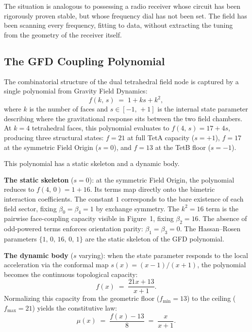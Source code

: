 \documentclass[twocolumn]{iopjournal}
\begin{document}
The situation is analogous to possessing a radio receiver whose circuit has been rigorously proven stable, but whose frequency dial has not been set. The field has been scanning every frequency, fitting to data, without extracting the tuning from the geometry of the receiver itself.

\subsection*{The GFD Coupling Polynomial}

The combinatorial structure of the dual tetrahedral field node is captured by a single polynomial from Gravity Field Dynamics:
\begin{equation}
f(k,\, s) \;=\; 1 + ks + k^2,
\end{equation}
where $k$ is the number of faces and $s \in [-1,\, +1]$ is the internal state parameter describing where the gravitational response sits between the two field chambers. At $k = 4$ tetrahedral faces, this polynomial evaluates to $f(4,\, s) = 17 + 4s$, producing three structural states: $f = 21$ at full TetA capacity ($s = +1$), $f = 17$ at the symmetric Field Origin ($s = 0$), and $f = 13$ at the TetB floor ($s = -1$).

This polynomial has a static skeleton and a dynamic body.

\textbf{The static skeleton} ($s = 0$): at the symmetric Field Origin, the polynomial reduces to $f(4,\, 0) = 1 + 16$. Its terms map directly onto the bimetric interaction coefficients. The constant $1$ corresponds to the bare existence of each field sector, fixing $\beta_0 = \beta_4 = 1$ by exchange symmetry. The $k^2 = 16$ term is the pairwise face-coupling capacity visible in Figure~1, fixing $\beta_2 = 16$. The absence of odd-powered terms enforces orientation parity: $\beta_1 = \beta_3 = 0$. The Hassan--Rosen parameters $\{1,\, 0,\, 16,\, 0,\, 1\}$ are the static skeleton of the GFD polynomial.

\textbf{The dynamic body} ($s$ varying): when the state parameter responds to the local acceleration via the conformal map $s(x) = (x - 1)/(x + 1)$, the polynomial becomes the continuous topological capacity:
\begin{equation}
f(x) \;=\; \frac{21x + 13}{x + 1}.
\end{equation}
Normalizing this capacity from the geometric floor ($f_{\min} = 13$) to the ceiling ($f_{\max} = 21$) yields the constitutive law:
\begin{equation}
\mu(x) \;=\; \frac{f(x) - 13}{8} \;=\; \frac{x}{x + 1}.
\end{equation}
\end{document}
